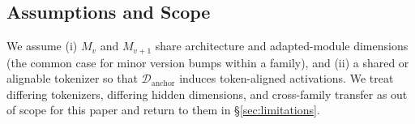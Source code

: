 \subsection{Assumptions and Scope}
\label{sec:assumptions}
We assume (i) $M_v$ and $M_{v+1}$ share architecture and adapted-module
dimensions (the common case for minor version bumps within a family), and
(ii) a shared or alignable tokenizer so that $\mathcal{D}_{\mathrm{anchor}}$
induces token-aligned activations. We treat differing tokenizers, differing
hidden dimensions, and cross-family transfer as out of scope for this paper and
return to them in \S\ref{sec:limitations}.
